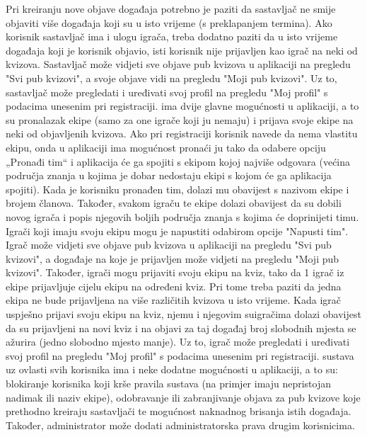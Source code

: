 		Pri kreiranju nove objave događaja potrebno je paziti da sastavljač ne smije objaviti više događaja koji su u isto vrijeme (s preklapanjem termina). Ako korisnik sastavljač ima i ulogu igrača, treba dodatno paziti da u isto vrijeme događaja koji je korisnik objavio, isti korisnik nije prijavljen kao igrač na neki od kvizova. Sastavljač može vidjeti sve objave pub kvizova u aplikaciji na pregledu "Svi pub kvizovi", a svoje objave vidi na pregledu "Moji pub kvizovi". Uz to, sastavljač može pregledati i uređivati svoj profil na pregledu "Moj profil" s podacima unesenim pri registraciji.
		\newline \newline
		 ima dvije glavne mogućnosti u aplikaciji, a to su pronalazak ekipe (samo za one igrače koji ju nemaju) i prijava svoje ekipe na neki od objavljenih kvizova. Ako pri registraciji korisnik navede da nema vlastitu ekipu, onda u aplikaciji ima mogućnost pronaći ju tako da odabere opciju „Pronađi tim“ i aplikacija će ga spojiti s ekipom kojoj najviše odgovara (većina područja znanja u kojima je dobar nedostaju ekipi s kojom će ga aplikacija spojiti). Kada je korisniku pronađen tim, dolazi mu obavijest s nazivom ekipe i brojem članova. Također, svakom igraču te ekipe dolazi obavijest da su dobili novog igrača i popis njegovih boljih područja znanja s kojima će doprinijeti timu. Igrači koji imaju svoju ekipu mogu je napustiti odabirom opcije "Napusti tim". Igrač može vidjeti sve objave pub kvizova u aplikaciji na pregledu "Svi pub kvizovi", a događaje na koje je prijavljen može vidjeti na pregledu "Moji pub kvizovi". Također, igrači mogu prijaviti svoju ekipu na kviz, tako da 1 igrač iz ekipe prijavljuje cijelu ekipu na određeni kviz. Pri tome treba paziti da jedna ekipa ne bude prijavljena na više različitih kvizova u isto vrijeme. Kada igrač uspješno prijavi svoju ekipu na kviz, njemu i njegovim suigračima dolazi obavijest da su prijavljeni na novi kviz i na objavi za taj događaj broj slobodnih mjesta se ažurira (jedno slobodno mjesto manje). Uz to, igrač može pregledati i uređivati svoj profil na pregledu "Moj profil" s podacima unesenim pri registraciji.
		\newline \newline
		 sustava uz ovlasti svih korisnika ima i neke dodatne mogućnosti u aplikaciji, a to su: blokiranje korisnika koji krše pravila sustava (na primjer imaju nepristojan nadimak ili naziv ekipe), odobravanje ili zabranjivanje objava za pub kvizove koje prethodno kreiraju sastavljači te mogućnost naknadnog brisanja istih događaja. Također, administrator može dodati administratorska prava drugim korisnicima.
